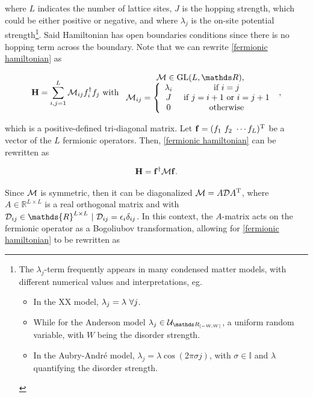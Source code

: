 \documentclass{homework}
\begin{document}
where $L$ indicates the number of lattice sites, $J$ is the hopping strength, which could be either positive or negative, and where $\lambda_j$ is the on-site potential strength\footnote{The $\lambda_j$-term frequently appears in many condensed matter models, with different numerical values and interpretations, eg.

\begin{itemize}
    \item In the XX model, $\lambda_j = \lambda \textnormal{ } \forall j$. 
    \item While for the Anderson model $\lambda_j \in \mathcal{U}_{\R_{[-W, W]}}$, a uniform random variable, with $W$ being the disorder strength. 
    \item In the Aubry-André model, $\lambda_j = \lambda \cos(2\pi\sigma j)$, with $\sigma \in \mathds{I}$ and $\lambda$ quantifying the disorder strength. 
\end{itemize}}. Said Hamiltonian has open boundaries conditions since there is no hopping term across the boundary. Note that we can rewrite \eqref{fermionic hamiltonian} as 

\begin{equation}
    {\bf H} = \sum_{i, j = 1}^{L} \M_{ij} f_i^{\dagger} f_j \textnormal{ with } \begin{array}{c}
         \M \in \textnormal{GL}(L, \R), \\
         \M_{ij} = \left\{\begin{array}{cc}
             \lambda_i & \textnormal{ if } i=j  \\
              J & \textnormal{ if } j=i+1 \textnormal{ or } i = j + 1 \\
              0 & \textnormal{ otherwise}
         \end{array} \right.
    \end{array},
\end{equation}

which is a positive-defined tri-diagonal matrix.
Let ${\bf f} = (f_1 \textnormal{ } f_2 \textnormal{ } \cdots f_L)^{\textnormal{T}}$ be a vector of the $L$ fermionic operators. Then, \eqref{fermionic hamiltonian} can be rewritten as 

\begin{align}
    {\bf H} = {\bf f}^\dagger \mathcal{M} {\bf f}.
\end{align}

Since $\mathcal{M}$ is symmetric, then it can be diagonalized  $\mathcal{M} = A \mathcal{D} A^{\textnormal{T}}$, where $A \in \mathds{R}^{L \times L}$ is a real orthogonal matrix and with $\mathcal{D}_{ij} \in \mathds{R}^{L \times L} \blanky | \blanky \mathcal{D}_{ij}  = \epsilon_i \delta_{ij}$. In this context, the $A$-matrix acts on the fermionic operator as a Bogoliubov transformation, allowing for \eqref{fermionic hamiltonian} to be rewritten as 
\end{document}
